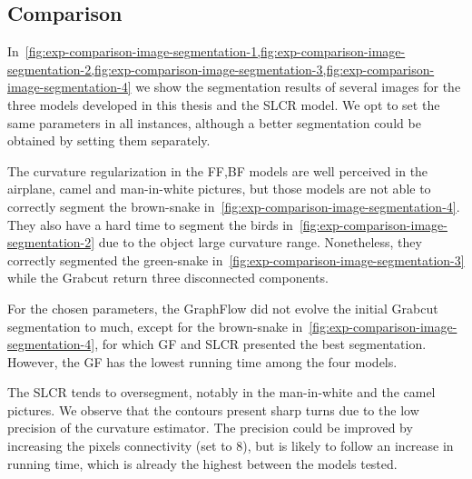 \subsection{Comparison}

In~\cref{fig:exp-comparison-image-segmentation-1,fig:exp-comparison-image-segmentation-2,fig:exp-comparison-image-segmentation-3,fig:exp-comparison-image-segmentation-4} we show the segmentation results of several images for the three models developed in this thesis and the SLCR model. We opt to set the same parameters in all instances, although a better segmentation could be obtained by setting them separately.

The curvature regularization in the FF,BF models are well perceived in the airplane, camel and man-in-white pictures, but those models are not able to correctly segment the brown-snake in~\cref{fig:exp-comparison-image-segmentation-4}. They also have a hard time to segment the birds in~\cref{fig:exp-comparison-image-segmentation-2} due to the object large curvature range. Nonetheless, they correctly segmented the green-snake in~\cref{fig:exp-comparison-image-segmentation-3} while the Grabcut return three disconnected components.

For the chosen parameters, the GraphFlow did not evolve the initial Grabcut segmentation to much, except for the brown-snake in~\cref{fig:exp-comparison-image-segmentation-4}, for which GF and SLCR presented the best segmentation. However, the GF has the lowest running time among the four models.

The SLCR tends to oversegment, notably in the man-in-white and the camel pictures. We observe that the contours present sharp turns due to the low precision of the curvature estimator. The precision could be improved by increasing the pixels connectivity (set to $8$), but is likely to follow an increase in running time, which is already the highest between the models tested.





\newcommand\segComparisonGF[2]{figures/chapter9/segmentation/comparison/#1/#2/alpha-0.0002/beta-1.0/gamma-3.0/radius-7}
\newcommand\segComparisonFF[2]{figures/chapter9/segmentation/comparison/#1/#2/alpha-0.5/beta-1.0/gamma-3.0/radius-7}
\newcommand\segComparisonScho[2]{figures/chapter9/segmentation/comparison/#1/lambda-2.0/gamma-1.0/#2}

